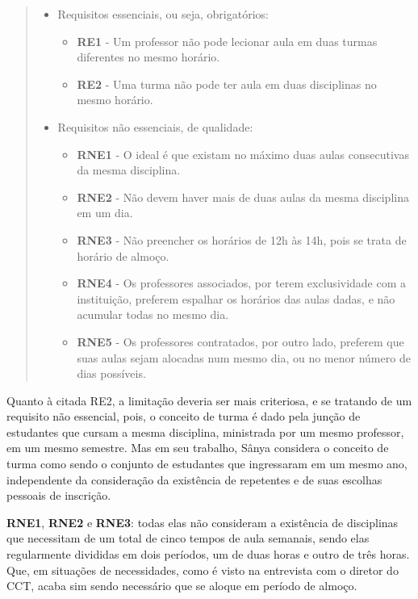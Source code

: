 \begin{quote}\footnotesize
  \begin{itemize}
    \item Requisitos essenciais, ou seja, obrigatórios:
          \begin{itemize}
            \item \textbf{RE1} - Um professor não pode lecionar aula em duas turmas diferentes no mesmo horário.
            \item \textbf{RE2} - Uma turma não pode ter aula em duas disciplinas no mesmo horário.
          \end{itemize}
    \item Requisitos não essenciais, de qualidade:
          \begin{itemize}
            \item \textbf{RNE1} - O ideal é que existam no máximo duas aulas consecutivas da mesma disciplina.
            \item \textbf{RNE2} - Não devem haver mais de duas aulas da mesma disciplina em um dia.
            \item \textbf{RNE3} - Não preencher os horários de 12h às 14h, pois se trata de horário de almoço.
            \item \textbf{RNE4} - Os professores associados, por terem exclusividade com a instituição, preferem espalhar os horários das aulas dadas, e não acumular todas no mesmo dia.
            \item \textbf{RNE5} - Os professores contratados, por outro lado, preferem que suas aulas sejam alocadas num mesmo dia, ou no menor número de dias possíveis.
          \end{itemize}
  \end{itemize}
\end{quote}

Quanto à citada RE2, a limitação deveria ser mais criteriosa, e se tratando de um requisito não essencial, pois, o conceito de turma é dado pela junção de estudantes que cursam a mesma disciplina, ministrada por um mesmo professor, em um mesmo semestre. Mas em seu trabalho, Sânya considera o conceito de turma como sendo o conjunto de estudantes que ingressaram em um mesmo ano, independente da consideração da existência de repetentes e de suas escolhas pessoais de inscrição.

\textbf{RNE1}, \textbf{RNE2} e \textbf{RNE3}: todas elas não consideram a existência de disciplinas que necessitam de um total de cinco tempos de aula semanais, sendo elas regularmente divididas em dois períodos, um de duas horas e outro de três horas. Que, em situações de necessidades, como é visto na entrevista com o diretor do CCT, acaba sim sendo necessário que se aloque em período de almoço.

